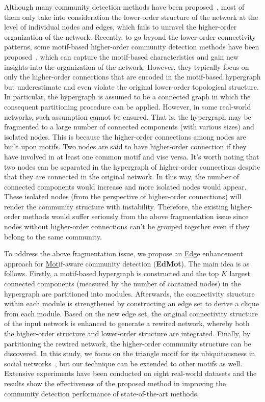 \documentclass[sigconf]{acmart}
\begin{document}
Although many community detection methods have been proposed~\cite{shao2015community,he2016joint,Vincent2008Fast}, most of them only take into consideration the lower-order structure of the network at the level of individual nodes and edges, which fails to unravel the higher-order organization of the network.
Recently, to go beyond the lower-order connectivity patterns, some motif-based higher-order community detection methods have been proposed~\cite{tsourakakis2017scalable,benson2016higher,Li_HigherorderBrain:18,DBLP:conf/icdm/HuangWC18,li2018community,Huang_AAAI2019}, which can capture the motif-based characteristics and gain new insights into the organization of the network. However,
they typically focus on only the higher-order connections that are encoded in the motif-based hypergraph but underestimate and even violate the original lower-order topological structure. In particular, the hypergraph is assumed to be a connected graph in which the consequent partitioning procedure can be applied. However, in some real-world networks, such assumption cannot be ensured. That is, the hypergraph may be fragmented to a large number of connected components (with various sizes) and isolated nodes.
This is because the higher-order connections among nodes are built upon motifs. Two nodes are said to have higher-order connection if they have involved in at least one common motif and vise versa. It's worth noting that two nodes can be separated in the hypergraph of higher-order connections despite that they are connected in the original network. In this way, the number of connected components would increase and more isolated nodes would appear. These isolated nodes (from the perspective of higher-order connections) will render the community structure with instability. Therefore, the existing higher-order methods would suffer seriously from the above fragmentation issue since nodes without higher-order connections can't be grouped together even if they belong to the same community.

To address the above fragmentation issue, we propose an \underline{Ed}ge enhancement approach for \underline{Mot}if-aware community detection (\textbf{EdMot}). The main idea is as follows. Firstly, a motif-based hypergraph is constructed and the top $K$ largest connected components (measured by the number of contained nodes) in the hypergraph are partitioned into modules. Afterwards, the connectivity structure within each module is strengthened by constructing an edge set to derive a clique from each module. Based on the new edge set, the original connectivity structure of the input network is enhanced to generate a rewired network, whereby both the higher-order structure and lower-order structure are integrated. Finally, by partitioning the rewired network, the higher-order community structure can be discovered. In this study, we focus on the triangle motif for its ubiquitousness in social networks~\cite{holland1977method,newman2003social,prat2016put}, but our technique can be extended to other motifs as well.
Extensive experiments have been conducted on eight real-world datasets and the results show the effectiveness of the proposed method in improving the community detection performance of state-of-the-art methods.
\end{document}
